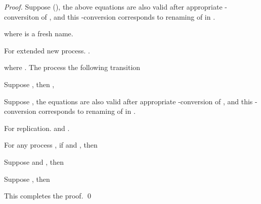 \documentclass[runningheads, envcountsame, a4paper]{llncs}
\begin{document}
\begin{proof}
  Suppose  (), the above equations are also valid after appropriate -conversiton of , and this -conversion corresponds to renaming of  in .
  
  where  is a fresh name.


  For extended new process. .
  
  where . The process the following transition
  
  Suppose , then ,
  
  
  Suppose , the equations are also valid after appropriate -conversion of , and this -conversion corresponds to renaming of  in .


  For replication.  and .
  

  For any process , if  and , then
  
  Suppose  and , then
  
  
  Suppose , then
  
  

  This completes the proof. \qed
\end{proof}
\end{document}
